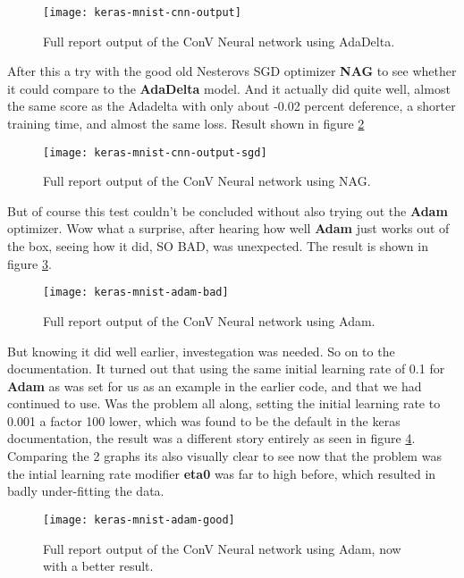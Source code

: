 \documentclass{article}
\begin{document}
\begin{figure}[H]
  \centering
    \texttt{[image: keras-mnist-cnn-output]}
    \caption{Full report output of the ConV Neural network using AdaDelta.}
    \label{fig:keras-mnist-cnn-output}
\end{figure}

\noindent
After this a try with the good old Nesterovs SGD optimizer \textbf{NAG} to see whether it could compare to the \textbf{AdaDelta} model. And it actually did quite well, almost the same score as the Adadelta with only about -0.02 percent deference, a shorter training time, and almost the same loss. Result shown in figure \ref{fig:keras-mnist-cnn-output-sgd}

\begin{figure}[H]
  \centering
    \texttt{[image: keras-mnist-cnn-output-sgd]}
    \caption{Full report output of the ConV Neural network using NAG.}
    \label{fig:keras-mnist-cnn-output-sgd}
\end{figure}

\noindent
But of course this test couldn't be concluded without also trying out the \textbf{Adam} optimizer.
Wow what a surprise, after hearing how well \textbf{Adam} just works out of the box, seeing how it did,
SO BAD, was unexpected. The result is shown in figure \ref{fig:keras-mnist-adam-bad}.

\begin{figure}[H]
  \centering
    \texttt{[image: keras-mnist-adam-bad]}
    \caption{Full report output of the ConV Neural network using Adam.}
    \label{fig:keras-mnist-adam-bad}
\end{figure}

\noindent

But knowing it did well earlier, investegation was needed. So on to the documentation. It turned out that using the same initial learning rate of 0.1 for \textbf{Adam} as was set for us as an example in the earlier code, and that we had continued to use. Was the problem all along, setting the initial learning rate to 0.001 a factor 100 lower, which was found to be the default in the keras documentation, the result was a different story entirely as seen in figure \ref{fig:keras-mnist-adam-good}.
Comparing the 2 graphs its also visually clear to see now that the problem was the intial learning rate modifier \textbf{eta0} was far to high before, which resulted in badly under-fitting the data.

\begin{figure}[H]
  \centering
    \texttt{[image: keras-mnist-adam-good]}
    \caption{Full report output of the ConV Neural network using Adam, now with a better result.}
    \label{fig:keras-mnist-adam-good}
\end{figure}
\end{document}
